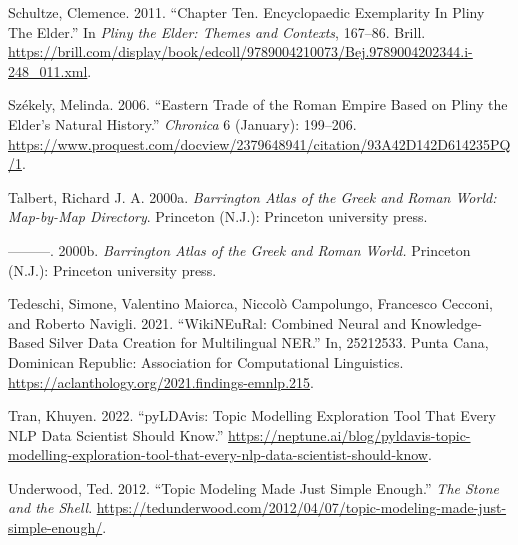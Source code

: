 \documentclass[
  12pt,
]{article}
\newlength{\cslhangindent}
\newlength{\cslentryspacingunit} %
\newenvironment{CSLReferences}[2] %
 {%
  \setlength{\parindent}{0pt}
  \ifodd #1
  \let\oldpar\par
  \def\par{\hangindent=\cslhangindent\oldpar}
  \fi
  \setlength{\parskip}{#2\cslentryspacingunit}
 }%
 {}
\begin{document}
\begin{CSLReferences}{1}{0}
\leavevmode{}%
Schultze, Clemence. 2011. {``Chapter {Ten}. {Encyclopaedic}
{Exemplarity} {In} {Pliny} {The} {Elder}.''} In \emph{Pliny the {Elder}:
{Themes} and {Contexts}}, 167--86. Brill.
\url{https://brill.com/display/book/edcoll/9789004210073/Bej.9789004202344.i-248_011.xml}.

\leavevmode{}%
Székely, Melinda. 2006. {``Eastern {Trade} of the {Roman} {Empire} Based
on {Pliny} the {Elder}'s {Natural} {History}.''} \emph{Chronica} 6
(January): 199--206.
\url{https://www.proquest.com/docview/2379648941/citation/93A42D142D614235PQ/1}.

\leavevmode{}%
Talbert, Richard J. A. 2000a. \emph{Barrington Atlas of the {Greek} and
{Roman} World: Map-by-Map Directory}. Princeton (N.J.): Princeton
university press.

\leavevmode{}%
---------. 2000b. \emph{Barrington Atlas of the {Greek} and {Roman}
World.} Princeton (N.J.): Princeton university press.

\leavevmode{}%
Tedeschi, Simone, Valentino Maiorca, Niccolò Campolungo, Francesco
Cecconi, and Roberto Navigli. 2021. {``WikiNEuRal: Combined Neural and
Knowledge-Based Silver Data Creation for Multilingual NER.''} In,
25212533. Punta Cana, Dominican Republic: Association for Computational
Linguistics. \url{https://aclanthology.org/2021.findings-emnlp.215}.

\leavevmode{}%
Tran, Khuyen. 2022. {``pyLDAvis: Topic Modelling Exploration Tool That
Every NLP Data Scientist Should Know.''}
\url{https://neptune.ai/blog/pyldavis-topic-modelling-exploration-tool-that-every-nlp-data-scientist-should-know}.

\leavevmode{}%
Underwood, Ted. 2012. {``Topic Modeling Made Just Simple Enough.''}
\emph{The Stone and the Shell}.
\url{https://tedunderwood.com/2012/04/07/topic-modeling-made-just-simple-enough/}.

\end{CSLReferences}
\end{document}
